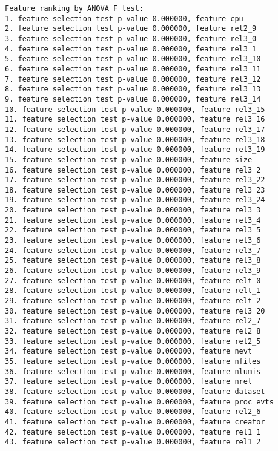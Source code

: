 \begin{verbatim}
Feature ranking by ANOVA F test:
1. feature selection test p-value 0.000000, feature cpu
2. feature selection test p-value 0.000000, feature rel2_9
3. feature selection test p-value 0.000000, feature rel3_0
4. feature selection test p-value 0.000000, feature rel3_1
5. feature selection test p-value 0.000000, feature rel3_10
6. feature selection test p-value 0.000000, feature rel3_11
7. feature selection test p-value 0.000000, feature rel3_12
8. feature selection test p-value 0.000000, feature rel3_13
9. feature selection test p-value 0.000000, feature rel3_14
10. feature selection test p-value 0.000000, feature rel3_15
11. feature selection test p-value 0.000000, feature rel3_16
12. feature selection test p-value 0.000000, feature rel3_17
13. feature selection test p-value 0.000000, feature rel3_18
14. feature selection test p-value 0.000000, feature rel3_19
15. feature selection test p-value 0.000000, feature size
16. feature selection test p-value 0.000000, feature rel3_2
17. feature selection test p-value 0.000000, feature rel3_22
18. feature selection test p-value 0.000000, feature rel3_23
19. feature selection test p-value 0.000000, feature rel3_24
20. feature selection test p-value 0.000000, feature rel3_3
21. feature selection test p-value 0.000000, feature rel3_4
22. feature selection test p-value 0.000000, feature rel3_5
23. feature selection test p-value 0.000000, feature rel3_6
24. feature selection test p-value 0.000000, feature rel3_7
25. feature selection test p-value 0.000000, feature rel3_8
26. feature selection test p-value 0.000000, feature rel3_9
27. feature selection test p-value 0.000000, feature relt_0
28. feature selection test p-value 0.000000, feature relt_1
29. feature selection test p-value 0.000000, feature relt_2
30. feature selection test p-value 0.000000, feature rel3_20
31. feature selection test p-value 0.000000, feature rel2_7
32. feature selection test p-value 0.000000, feature rel2_8
33. feature selection test p-value 0.000000, feature rel2_5
34. feature selection test p-value 0.000000, feature nevt
35. feature selection test p-value 0.000000, feature nfiles
36. feature selection test p-value 0.000000, feature nlumis
37. feature selection test p-value 0.000000, feature nrel
38. feature selection test p-value 0.000000, feature dataset
39. feature selection test p-value 0.000000, feature proc_evts
40. feature selection test p-value 0.000000, feature rel2_6
41. feature selection test p-value 0.000000, feature creator
42. feature selection test p-value 0.000000, feature rel1_1
43. feature selection test p-value 0.000000, feature rel1_2

\end{verbatim}
